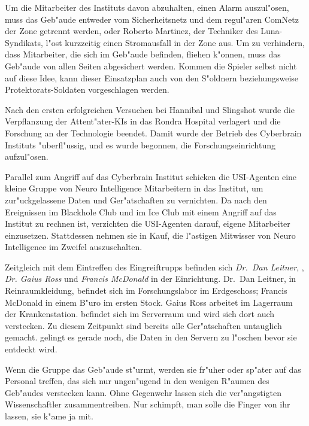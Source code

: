 Um die Mitarbeiter des Instituts davon abzuhalten, einen Alarm auszul"osen, muss das Geb"aude entweder vom Sicherheitsnetz und dem regul"aren ComNetz der Zone getrennt werden, oder Roberto Martinez, der Techniker des Luna-Syndikats, l"ost kurzzeitig einen Stromausfall in der Zone aus. Um zu verhindern, dass Mitarbeiter, die sich im Geb"aude befinden, fliehen k"onnen, muss das Geb"aude von allen Seiten abgesichert werden. Kommen die Spieler selbst nicht auf diese Idee, kann dieser Einsatzplan auch von den S"oldnern beziehungsweise Protektorats-Soldaten vorgeschlagen werden.


Nach den ersten erfolgreichen Versuchen bei Hannibal und Slingshot wurde die Verpflanzung der Attent"ater-KIs in das Rondra Hospital verlagert und die Forschung an der Technologie beendet. Damit wurde der Betrieb des Cyberbrain Instituts "uberfl"ussig, und es wurde begonnen, die Forschungseinrichtung aufzul"osen. 

Parallel zum Angriff auf das Cyberbrain Institut schicken die USI-Agenten eine kleine Gruppe von Neuro Intelligence Mitarbeitern in das Institut, um zur"uckgelassene Daten und Ger"atschaften zu vernichten. Da nach den Ereignissen im Blackhole Club und im Ice Club mit einem Angriff auf das Institut zu rechnen ist, verzichten die USI-Agenten darauf, eigene Mitarbeiter einzusetzen. Stattdessen nehmen sie in Kauf, die l"astigen Mitwisser von Neuro Intelligence im Zweifel auszuschalten.

Zeitgleich mit dem Eintreffen des Eingreiftrupps befinden sich \emph{Dr.~Dan Leitner}, \emph{\ml{}}, \emph{Dr. Gaius Ross} und \emph{Francis McDonald} in der Einrichtung. Dr.~Dan Leitner, in Reinraumkleidung, befindet sich im Forschungslabor im Erdgeschoss; Francis McDonald in einem B"uro im ersten Stock. Gaius Ross arbeitet im Lagerraum der Krankenstation. \ml{} befindet sich im Serverraum und wird sich dort auch verstecken. Zu diesem Zeitpunkt sind bereits alle Ger"atschaften untauglich gemacht. \ml{} gelingt es gerade noch, die Daten in den Servern zu l"oschen bevor sie entdeckt wird.

Wenn die Gruppe das Geb"aude st"urmt, werden sie fr"uher oder sp"ater auf das Personal treffen, das sich nur ungen"ugend in den wenigen R"aumen des Geb"audes verstecken kann. Ohne Gegenwehr lassen sich die ver"angstigten Wissenschaftler zusammentreiben. Nur \ml{} schimpft, man solle die Finger von ihr lassen, sie k"ame ja mit.

